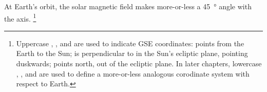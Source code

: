 


At Earth's orbit, the solar magnetic field makes more-or-less a \SI{45}{\degree} angle with the \X axis. 
\footnote{Uppercase \X, \Y, and \Z are used to indicate GSE coordinates: \X points from the Earth to the Sun; \Y is perpendicular to \X in the Sun's ecliptic plane, pointing duskwards; \Z points north, out of the ecliptic plane. In later chapters, lowercase \x, \y, and \z are used to define a more-or-less analogous corodinate system with respect to Earth. }





















